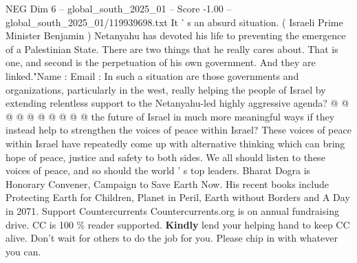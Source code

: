 \begin{textsample}{NEG Dim 6 – global\_south\_2025\_01 – Score -1.00 – global\_south\_2025\_01/119939698.txt}
It ' s an absurd situation. ( Israeli Prime Minister Benjamin ) Netanyahu has devoted his life to preventing the emergence of a Palestinian State.
There are two things that he really cares about.
That is one, and second is the perpetuation of his own government.
And they are linked."Name : Email : In such a situation are those governments and organizations, particularly in the west, really helping the people of Israel by extending relentless support to the Netanyahu-led highly aggressive agenda? @ @ @ @ @ @ @ @ @ @ the future of Israel in much more meaningful ways if they instead help to strengthen the voices of peace within Israel?
These voices of peace within Israel have repeatedly come up with alternative thinking which can bring hope of peace, justice and safety to both sides.
We all should listen to these voices of peace, and so should the world ' s top leaders.
Bharat Dogra is Honorary Convener, Campaign to Save Earth Now.
His recent books include Protecting Earth for Children, Planet in Peril, Earth without Borders and A Day in 2071.
Support Countercurrents Countercurrents.org is on annual fundraising drive.
CC is 100 \% reader supported. \textbf{Kindly} lend your helping hand to keep CC alive.
Don't wait for others to do the job for you.
Please chip in with whatever you can.

\end{textsample}
